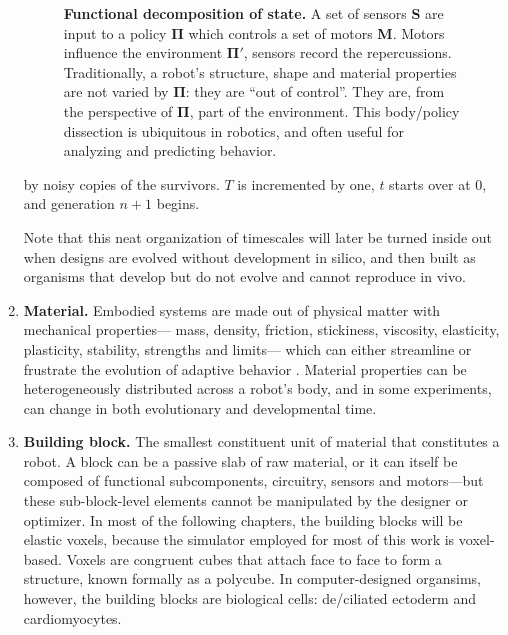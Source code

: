 \begin{enumerate}
\begin{figure}[H]
\begin{minipage}[t]{0.47\linewidth}
        \caption{\label{fig:policy}\textbf{Functional decomposition of state.} A set of sensors {\rm\textbf{S}} are input to a policy $\mathbf{\Pi}$ which controls a set of motors {\rm\textbf{M}}.
        Motors influence the environment $\mathbf{\Pi'}$, sensors record the repercussions.
        Traditionally, a robot's structure, shape and material properties are not varied by $\mathbf{\Pi}$: they are ``out of control''.
        They are, from the perspective of $\mathbf{\Pi}$, part of the environment.
        This body/policy 
        dissection is ubiquitous in robotics, and often useful for analyzing and predicting behavior.
        }
    \end{minipage}
    \end{figure}
    by noisy copies of the survivors.
    $T$ is incremented by one, $t$ starts over at 0, and generation $n+1$ begins.
    
    
    
    Note that this neat organization of timescales will
    later be turned inside out when designs are evolved without development in silico, and then built as organisms that develop but do not evolve and cannot reproduce in vivo.
    
    \item \textbf{Material.} Embodied systems are made out of physical matter
    with mechanical properties---%
    mass, density, friction,
    stickiness,
    viscosity,
    elasticity, plasticity,
    stability,
    strengths and limits---%
    which can either streamline or frustrate the evolution of adaptive behavior 
    \cite{vaughan2004evolution}.
    Material properties can be heterogeneously distributed across a robot's body, and in some experiments, 
    can change in both evolutionary and developmental time.

    
    \item \textbf{Building block.} 
    The smallest constituent unit of material that constitutes a robot.
    A block can be a passive slab of raw material,
    or it can itself be composed
    of functional subcomponents, circuitry, sensors and motors---but these sub-block-level elements cannot be manipulated by the designer or optimizer.
    In most of the following chapters,
    the building blocks will be elastic voxels, because the simulator employed for most of this work is voxel-based.
    Voxels are
    congruent cubes that attach face to face to form a structure, known formally as a polycube.
    In computer-designed organsims, however, the building blocks are biological cells: de/ciliated ectoderm and cardiomyocytes.
    

\end{enumerate}
